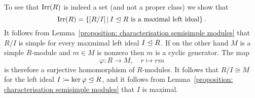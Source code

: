 

\begin{remark}
  To see that $\operatorname{Irr}(R)$ is indeed a set (and not a proper class) we show that
  \[
      \Irr(R)
    = \{
        [R/I]
      \suchthat
        \text{$I \idealleq R$ is a maximal left ideal}
      \} \,.
  \]
  It follows from Lemma~\ref{proposition: characterisation semisimple modules} that $R/I$ is simple for every maxmimal left ideal $I \trianglelefteq R$.
  If on the other hand $M$ is a simple $R$-module and $m \in M$ is nonzero then $m$ is a cyclic generator.
  The map
  \[
            \varphi
    \colon  R
    \to     M,
    \quad   r
    \mapsto rm
  \]
  is therefore a surjective homomorphism of $R$-modules.
  It follows that $R/I \cong M$ for the left ideal $I \coloneqq \ker \varphi \trianglelefteq R$, and it follows from Lemma~\ref{proposition: characterisation semisimple modules} that $I$ is maximal.

  
%   
%   
%   
\end{remark}

